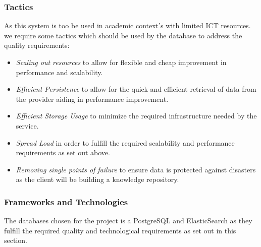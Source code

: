 \subsubsection{Tactics}
As this system is too be used in academic context's with limited ICT resources.
we require some tactics which should be used by the database to address the quality requirements:
\begin{itemize}
	\item \textit{Scaling out resources} to allow for flexible and cheap
		improvement in performance and scalability.
	\item \textit{Efficient Persistence} to allow for the quick and efficient
		retrieval of data from the provider aiding in performance
		improvement.
	\item \textit{Efficient Storage Usage} to minimize the required
	infrastructure needed by the service.
	\item \textit{Spread Load} in order to fulfill the required scalability
		and performance requirements as set out above.
	\item \textit{Removing single points of failure} to ensure data is
		protected against disasters as the client will be building a
		knowledge repository.
\end{itemize}

\subsubsection{Frameworks and Technologies}
The databases chosen for the project is a PostgreSQL and ElasticSearch as they
fulfill the required quality and technological requirements as set out in this 
section.
